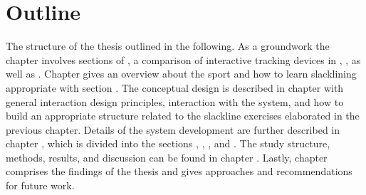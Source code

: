 \section{Outline}
The structure of the thesis outlined in the following.
As a groundwork the \textit{} chapter involves sections of \textit{}, a comparison of interactive tracking devices in \textit{}, \textit{}, as well as \textit{}. Chapter \textit{} gives an overview about the sport and how to learn slacklining appropriate with section \textit{}.
The conceptual design is described in chapter \textit{} with general interaction design principles, interaction with the system, and how to build an appropriate structure related to the slackline exercises elaborated in the previous chapter.
Details of the system development are further described in chapter \textit{}, which is divided into the sections \textit{}, \textit{}, \textit{}, and \textit{}.
The study structure, methods, results, and discussion can be found in chapter \textit{}. Lastly, chapter \textit{} comprises the findings of the thesis and gives approaches and recommendations for future work.

\begin{comment}
The thesis is structured as follows:
As a groundwork the \textbf{\nameref{2_relatedWork}} chapter involves basics of \textbf{\nameref{2_2_slacklineTraining}}, a number of possible interactive tracking devices that will be compared in the section \textbf{\nameref{2_3_interactiveTechnology}}, and \textbf{\nameref{2_4_methods}}.

- \todo{Further chapters}

A List of \textbf{\nameref{tablesRef}}, \textbf{\nameref{listFiguresRef}}, \textbf{\nameref{listAbbreviationsRef}} and the \textbf{\nameref{bibliographyRef}}  can be found at the end of the thesis.

\end{comment}